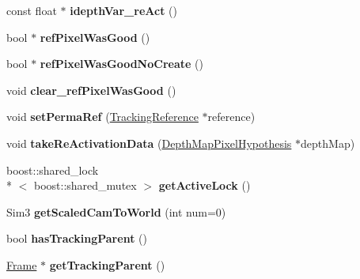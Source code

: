 \begin{DoxyCompactItemize}
\item 
\hypertarget{classlsd__slam_1_1_frame_a8e128c8fdc004bd808c365c1ea38c9bd}{const float $\ast$ {\bfseries idepth\-Var\-\_\-re\-Act} ()}\label{classlsd__slam_1_1_frame_a8e128c8fdc004bd808c365c1ea38c9bd}

\item 
\hypertarget{classlsd__slam_1_1_frame_a8c3122c4784b9a8ae66210205bf531d1}{bool $\ast$ {\bfseries ref\-Pixel\-Was\-Good} ()}\label{classlsd__slam_1_1_frame_a8c3122c4784b9a8ae66210205bf531d1}

\item 
\hypertarget{classlsd__slam_1_1_frame_adb19bd5898e7d6e8ceb9a826096d166e}{bool $\ast$ {\bfseries ref\-Pixel\-Was\-Good\-No\-Create} ()}\label{classlsd__slam_1_1_frame_adb19bd5898e7d6e8ceb9a826096d166e}

\item 
\hypertarget{classlsd__slam_1_1_frame_a89c328ba630444fa4324c2c33b3141f3}{void {\bfseries clear\-\_\-ref\-Pixel\-Was\-Good} ()}\label{classlsd__slam_1_1_frame_a89c328ba630444fa4324c2c33b3141f3}

\item 
\hypertarget{classlsd__slam_1_1_frame_a3e56b78f4f1989fa15fa3da5dfb97c81}{void {\bfseries set\-Perma\-Ref} (\hyperlink{classlsd__slam_1_1_tracking_reference}{Tracking\-Reference} $\ast$reference)}\label{classlsd__slam_1_1_frame_a3e56b78f4f1989fa15fa3da5dfb97c81}

\item 
\hypertarget{classlsd__slam_1_1_frame_aab79f2a5a9f59c2cf2b9714ad48c53ae}{void {\bfseries take\-Re\-Activation\-Data} (\hyperlink{classlsd__slam_1_1_depth_map_pixel_hypothesis}{Depth\-Map\-Pixel\-Hypothesis} $\ast$depth\-Map)}\label{classlsd__slam_1_1_frame_aab79f2a5a9f59c2cf2b9714ad48c53ae}

\item 
\hypertarget{classlsd__slam_1_1_frame_af73ccb75e1e449d9a8f2044246ee3530}{boost\-::shared\-\_\-lock\\*
$<$ boost\-::shared\-\_\-mutex $>$ {\bfseries get\-Active\-Lock} ()}\label{classlsd__slam_1_1_frame_af73ccb75e1e449d9a8f2044246ee3530}

\item 
\hypertarget{classlsd__slam_1_1_frame_a0f4a92d51569c280e4b37acbf562ea47}{Sim3 {\bfseries get\-Scaled\-Cam\-To\-World} (int num=0)}\label{classlsd__slam_1_1_frame_a0f4a92d51569c280e4b37acbf562ea47}

\item 
\hypertarget{classlsd__slam_1_1_frame_a013921be6869702deac98090a8c9033c}{bool {\bfseries has\-Tracking\-Parent} ()}\label{classlsd__slam_1_1_frame_a013921be6869702deac98090a8c9033c}

\item 
\hypertarget{classlsd__slam_1_1_frame_ae337afb7e308ff6d9be3ffa354fc66d6}{\hyperlink{classlsd__slam_1_1_frame}{Frame} $\ast$ {\bfseries get\-Tracking\-Parent} ()}\label{classlsd__slam_1_1_frame_ae337afb7e308ff6d9be3ffa354fc66d6}

\end{DoxyCompactItemize}
